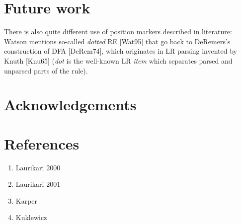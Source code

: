 \documentclass{article}
\theoremstyle{definition}
\begin{document}
\begin{multicols}{2}
\section{Future work}\label{section_future_work}

There is also quite different use of position markers described in literature:
Watson mentions so-called \emph{dotted} RE [Wat95]
that go back to DeRemers's construction of DFA [DeRem74],
which originates in LR parsing invented by Knuth [Knu65]
(\emph{dot} is the well-known LR \emph{item} which separates parsed and unparsed parts of the rule).

\section*{Acknowledgements}

\end{multicols}
\pagebreak

\section*{References}

\begin{enumerate}
\item Laurikari 2000
\item Laurikari 2001
\item Karper
\item Kuklewicz
\end{enumerate}
\end{document}
